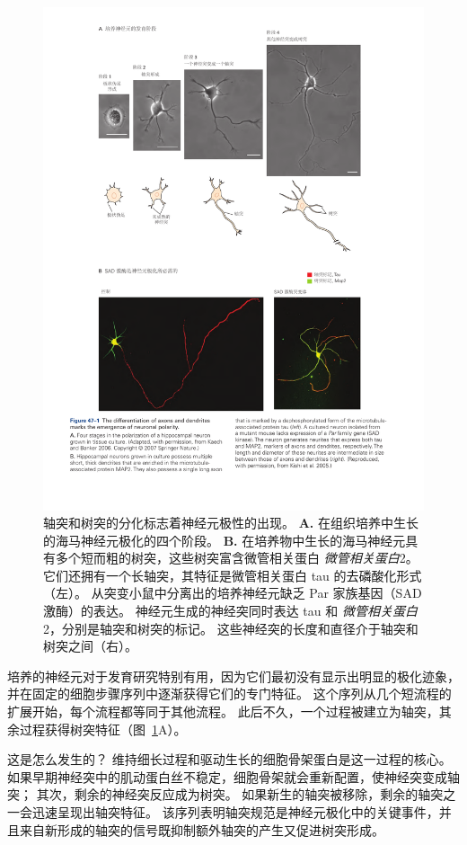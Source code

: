 \begin{figure}[htbp]
	\centering
	\includegraphics[width=0.85\linewidth]{chap47/fig_47_1}
	\caption{轴突和树突的分化标志着神经元极性的出现。
		\textbf{A.} 在组织培养中生长的海马神经元极化的四个阶段\cite{kaech2006culturing}。
		\textbf{B.} 在培养物中生长的海马神经元具有多个短而粗的树突，这些树突富含微管相关蛋白 \textit{微管相关蛋白}2。
		它们还拥有一个长轴突，其特征是微管相关蛋白 tau 的去磷酸化形式（左）。
		从突变小鼠中分离出的培养神经元缺乏 Par 家族基因（SAD 激酶）的表达。
		神经元生成的神经突同时表达 tau 和 \textit{微管相关蛋白}2，分别是轴突和树突的标记。
		这些神经突的长度和直径介于轴突和树突之间（右）\cite{kishi2005mammalian}。}
	\label{fig:47_1}
\end{figure}


培养的神经元对于发育研究特别有用，因为它们最初没有显示出明显的极化迹象，并在固定的细胞步骤序列中逐渐获得它们的专门特征。
这个序列从几个短流程的扩展开始，每个流程都等同于其他流程。
此后不久，一个过程被建立为轴突，其余过程获得树突特征（图~\ref{fig:47_1}A）。


这是怎么发生的？
维持细长过程和驱动生长的细胞骨架蛋白是这一过程的核心。
如果早期神经突中的肌动蛋白丝不稳定，细胞骨架就会重新配置，使神经突变成轴突；
其次，剩余的神经突反应成为树突。
如果新生的轴突被移除，剩余的轴突之一会迅速呈现出轴突特征。
该序列表明轴突规范是神经元极化中的关键事件，并且来自新形成的轴突的信号既抑制额外轴突的产生又促进树突形成。


